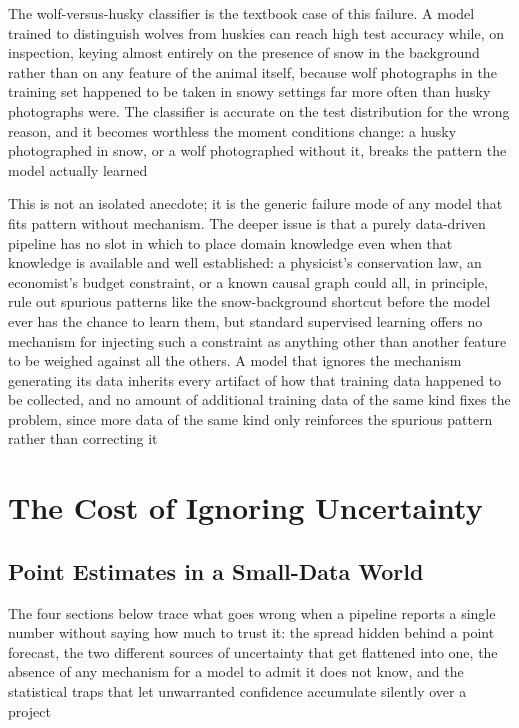 The wolf-versus-husky classifier is the textbook case of this failure. A model
trained to distinguish wolves from huskies can reach high test accuracy while, on
inspection, keying almost entirely on the presence of snow in the background
rather than on any feature of the animal itself, because wolf photographs in the
training set happened to be taken in snowy settings far more often than husky photographs
were. The classifier is accurate on the test distribution for the wrong reason, and
it becomes worthless the moment conditions change: a husky photographed in snow,
or a wolf photographed without it, breaks the pattern the model actually learned

This is not an isolated anecdote; it is the generic failure mode of any model
that fits pattern without mechanism. The deeper issue is that a purely data-driven
pipeline has no slot in which to place domain knowledge even when that knowledge
is available and well established: a physicist's conservation law, an economist's
budget constraint, or a known causal graph could all, in principle, rule out
spurious patterns like the snow-background shortcut before the model ever has
the chance to learn them, but standard supervised learning offers no mechanism for
injecting such a constraint as anything other than another feature to be weighed
against all the others. A model that ignores the mechanism generating its data
inherits every artifact of how that training data happened to be collected, and no
amount of additional training data of the same kind fixes the problem, since
more data of the same kind only reinforces the spurious pattern rather than
correcting it

\section{The Cost of Ignoring Uncertainty}
\label{chap:cost-ignoring-uncertainty}

\subsection{Point Estimates in a Small-Data World}
\label{sec:point-estimates-small-data}

The four sections below trace what goes wrong when a pipeline reports a single number
without saying how much to trust it: the spread hidden behind a point forecast, the
two different sources of uncertainty that get flattened into one, the absence of
any mechanism for a model to admit it does not know, and the statistical traps that
let unwarranted confidence accumulate silently over a project

